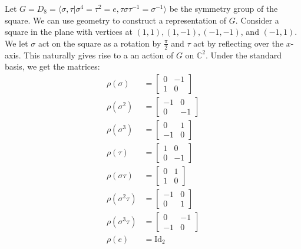 \begin{example}
Let $G = D_8 = \langle \sigma, \tau |  \sigma^4 = \tau^2 = e, \tau \sigma \tau^{-1} = \sigma^{-1} \rangle$ be the symmetry group of the square.  We can use geometry to construct a representation of $G$.  Consider a square in the plane with vertices at $(1,1), (1,-1), (-1, -1)$, and $(-1, 1)$.  We let $\sigma$ act on the square as a rotation by $\frac{\pi}{2}$ and $\tau$ act by reflecting over the $x$-axis.  This naturally gives rise to a an action of $G$ on $\mathbb{C}^2$.  Under the standard basis, we get the matrices:
\begin{align*}
\rho (\sigma) &= \begin{bmatrix} 0 & -1 \\ 1 & 0  \end{bmatrix} \\
\rho (\sigma^2) &= \begin{bmatrix} -1 & 0 \\ 0 & -1  \end{bmatrix} \\ 
\rho (\sigma^3) &= \begin{bmatrix} 0 & 1 \\ -1 & 0  \end{bmatrix} \\
\rho (\tau) &= \begin{bmatrix} 1 & 0 \\ 0 & -1\end{bmatrix} \\
\rho (\sigma \tau ) &= \begin{bmatrix} 0 & 1 \\ 1 & 0\end{bmatrix} \\
\rho (\sigma^2 \tau) &= \begin{bmatrix} -1 & 0 \\ 0 & 1\end{bmatrix} \\
\rho (\sigma^3 \tau) &= \begin{bmatrix} 0 & -1 \\ -1 & 0\end{bmatrix} \\
\rho( e) &= \text{Id}_2
\end{align*}

\end{example}
%

